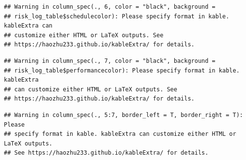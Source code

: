 \documentclass[
]{article}
\begin{document}
\begin{verbatim}
## Warning in column_spec(., 6, color = "black", background =
## risk_log_table$schedulecolor): Please specify format in kable. kableExtra can
## customize either HTML or LaTeX outputs. See
## https://haozhu233.github.io/kableExtra/ for details.
\end{verbatim}

\begin{verbatim}
## Warning in column_spec(., 7, color = "black", background =
## risk_log_table$performancecolor): Please specify format in kable. kableExtra
## can customize either HTML or LaTeX outputs. See
## https://haozhu233.github.io/kableExtra/ for details.
\end{verbatim}

\begin{verbatim}
## Warning in column_spec(., 5:7, border_left = T, border_right = T): Please
## specify format in kable. kableExtra can customize either HTML or LaTeX outputs.
## See https://haozhu233.github.io/kableExtra/ for details.
\end{verbatim}
\end{document}
